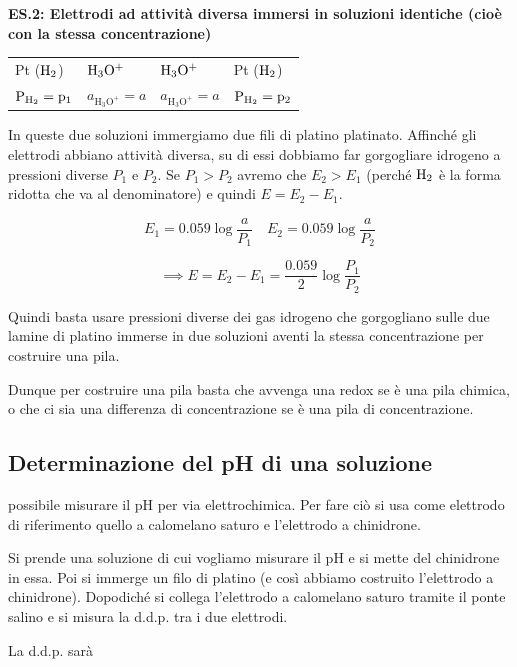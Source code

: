 \vspace{0.2cm}\textbf{ES.2: Elettrodi ad attività diversa immersi in soluzioni identiche (cioè con la stessa concentrazione)}

\begin{center}
    \begin{tabular}{p{1.8cm}|p{2cm}||p{2cm}|p{2cm}}
        Pt ($\rm H_2$) & $\rm H_3O^+$ & $\rm H_3O^+$ & Pt ($\rm H_2$)\\[0.5ex]
        $\rm P_{H_2} = p_1$ & $a_{\text{H}_3\text{O}^+}=a$ & $a_{\text{H}_3\text{O}^+}=a$ & $\rm P_{H_2} = p_2$\\[0.5ex]
    \end{tabular}
\end{center}

In queste due soluzioni immergiamo due fili di platino platinato. Affinché gli elettrodi abbiano attività diversa, su di essi dobbiamo far gorgogliare idrogeno a pressioni diverse $P_1$ e $P_2$. Se $P_1>P_2$ avremo che $E_2>E_1$ (perché $\rm H_2$ è la forma ridotta che va al denominatore) e quindi $E= E_2 - E_1$. 

$$E_1 = 0.059 \log \frac{a}{P_1} \quad E_2 = 0.059 \log \frac{a}{P_2}$$

$$\implies E = E_2 - E_1 = \frac{0.059}{2} \log \frac{P_1}{P_2}$$

Quindi basta usare pressioni diverse dei gas idrogeno che gorgogliano sulle due lamine di platino immerse in due soluzioni aventi la stessa concentrazione per costruire una pila.

\vspace{0.2cm}Dunque per costruire una pila basta che avvenga una redox se è una pila chimica, o che ci sia una differenza di concentrazione se è una pila di concentrazione.
\subsection{Determinazione del pH di una soluzione}

\E possibile misurare il pH per via elettrochimica. Per fare ciò si usa come elettrodo di riferimento quello a calomelano saturo e l'elettrodo a chinidrone.

Si prende una soluzione di cui vogliamo misurare il pH e si mette del chinidrone in essa. Poi si immerge un filo di platino (e così abbiamo costruito l'elettrodo a chinidrone). Dopodiché si collega l'elettrodo a calomelano saturo tramite il ponte salino e si misura la d.d.p. tra i due elettrodi. 

La d.d.p. sarà

